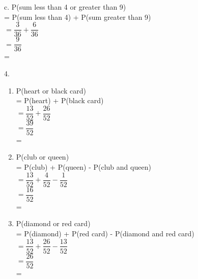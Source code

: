 c. P(sum less than 4 or greater than 9) \\
= P(sum less than 4) + P(sum greater than 9) \redcheck \\
$ = \dfrac{3}{36} + \dfrac{6}{36} $ \redcheck \\
$ = \dfrac{9}{36} $ \redcheck \\
= \redcheck 

4. 
\begin{enumerate}[label = \alph*. ]
\item P(heart or black card) \\
= P(heart) + P(black card) \redcheck \\
$ = \dfrac{13}{52} + \dfrac{26}{52} $ \redcheck \\
$ = \dfrac{39}{52} $ \redcheck \\
= \redcheck 

\item P(club or queen) \\
= P(club) + P(queen) - P(club and queen)  \redcheck \\
$ = \dfrac{13}{52} + \dfrac{4}{52} - \dfrac{1}{52} $ \redcheck \\
$ = \dfrac{16}{52} $ \redcheck \\
= \redcheck 

\item P(diamond or red card) \\
= P(diamond) + P(red card) - P(diamond and red card)  \redcheck \\
$ = \dfrac{13}{52} + \dfrac{26}{52} - \dfrac{13}{52} $ \redcheck \\
$ = \dfrac{26}{52} $ \redcheck \\
= \redcheck 
\end{enumerate} 
